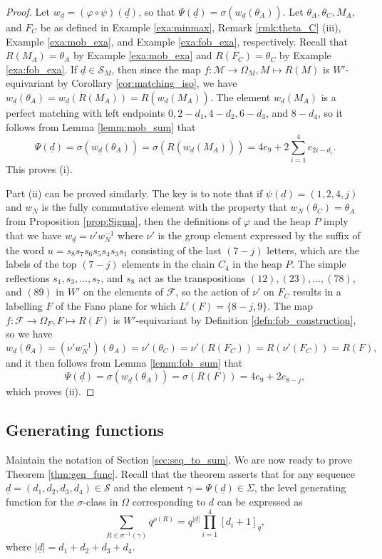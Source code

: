 \documentclass[10pt,a4paper]{amsart}
\numberwithin{equation}{section}
\newcommand{\ra}{\rightarrow}
\newcommand{\lc}{L^c}
\newcommand{\wnn}{w_{N}}
\newcommand{\seqd}{\underline{d}}
\newcommand{\calf}{\mathcal{F}}
\newcommand{\calm}{\mathcal{M}}
\newcommand{\cals}{\mathcal{S}}
\newcommand{\ob}{\Omega}
\newcommand{\fob}{\Omega_F}
\newcommand{\mob}{\Omega_M}
\newcommand{\inverse}{^{-1}}
\newcommand{\abs}[1]{\lvert #1 \rvert}
\begin{document}
\begin{proof}
  Let $w_{\seqd}=(\varphi\circ \psi)(\seqd)$, so that
  $\Psi(\seqd)=\sigma(w_{\seqd}(\theta_A))$. Let $\theta_A, \theta_C, M_A,$ and
  $F_C$ be as defined in Example \ref{exa:minmax}, Remark \ref{rmk:theta_C}
  (iii), Example \ref{exa:mob_exa}, and Example \ref{exa:fob_exa}, respectively.
  Recall that $R(M_A)=\theta_A$ by Example \ref{exa:mob_exa} and
  $R(F_C)=\theta_C$ by  Example \ref{exa:fob_exa}. 
%
  If $\seqd\in \cals_M$, then since the map $f:\calm\ra \mob, M\mapsto R(M)$ is
  $W'$-equivariant by Corollary \ref{cor:matching_iso}, we have
  $w_{\seqd}(\theta_A)=w_{\seqd}(R(M_A))=R(w_{\seqd}(M_A))$. The element
  $w_{\seqd}(M_A)$ is a perfect
  matching with left endpoints $0, 2-d_1, 4-d_2, 6-d_3$, and $8-d_4$, so it
  follows from Lemma \ref{lemm:mob_sum} that \[
    \Psi(\seqd)=\sigma(w_{\seqd}(\theta_A))=\sigma(R(w_{\seqd}(M_A)))= 4e_9+2\sum_{i=1}^4
e_{2i-d_i}. \] This proves (i). 

Part (ii) can be proved similarly. The key is to note that if
$\psi(\seqd)=(1,2,4,j)$ and $\wnn$ is the fully commutative element with the property that
$\wnn(\theta_C)=\theta_A$ from Proposition \ref{prop:Sigma}, then the definitions of
$\varphi$ and the heap $P$ imply that we have $w_{\seqd}=\nu'\wnn\inverse$ where $\nu'$
is the group element expressed by the suffix of the word $u={s_8s_7s_6s_5s_4s_3s_1}$
consisting of the last $(7-j)$ letters, which are the labels of the top $(7-j)$
elements in the chain $C_4$ in the heap $P$. The simple reflections $s_1, s_3,
\dots, s_7$, and $s_8$ act as the transpositions $(12), (23), \dots, (78)$, and
$(89)$ in $W'$ on the elements of $\calf$, so the action of $\nu'$ 
on $F_C$ results in a labelling $F$ of the Fano plane for which
$\lc(F)=\{8-j,9\}$. The map $f:\calf\ra \fob, F\mapsto R(F)$ is $W'$-equivariant
by Definition \ref{defn:fob_construction}, so we have 
\[
  w_{\seqd}(\theta_A)=(\nu'\wnn\inverse)(\theta_A)=\nu'(\theta_C)=\nu'(R(F_C))=R(\nu'(F_C))=R(F),
\]
and it then follows from Lemma \ref{lemm:fob_sum} that 
\[
  \Psi(\seqd)=\sigma(w_{\seqd}(\theta_A))=\sigma(R(F))=4e_9+2e_{8-j},
\]
which proves (ii).
\end{proof}


\subsection{Generating functions}
\label{sec:gen_func}

Maintain the notation of Section \ref{sec:seq_to_sum}.  We are now ready to
prove Theorem \ref{thm:gen_func}. Recall that the theorem asserts that for any
sequence  $\seqd=(d_1,d_2,d_3,d_4)\in \cals$ and the element $\gamma=\Psi(\seqd)\in
\Sigma$, the level generating function for the $\sigma$-class in $\ob$
corresponding to $d$ can be expressed as
\begin{equation} \label{eq:seq_to_gen} \sum_{R\in
\sigma\inverse(\gamma)}q^{\rho(R)}=q^{\abs{\seqd}}\prod_{i=1}^4 [d_i+1]_q,
\end{equation}
where $\abs{\seqd}=d_1+d_2+d_3+d_4$.
\end{document}
